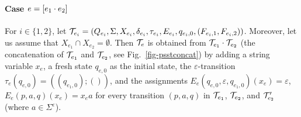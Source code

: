 %	

\paragraph{Case $e = [e_1 \cdot e_2]$} 
For $i \in \{1,2\}$, let  
$\mathcal{T}_{e_i} = (Q_{e_i}, \Sigma, X_{e_i}, \delta_{e_i}, \tau_{e_i}, E_{e_i}, q_{e_i,0}, (F_{e_i,1}, F_{e_i,2}))$. Moreover, let us assume that $X_{e_1}\cap X_{e_2}=\emptyset$.
Then $\mathcal{T}_e$ is obtained from $\mathcal{T}_{e_1} \cdot \mathcal{T}_{e_2}$ (the concatenation of $\mathcal{T}_{e_1}$ and $\mathcal{T}_{e_2}$, see Fig.~\ref{fig-psstconcat}) by adding a string variable $x_e$, a fresh state $q_{e,0}$ as the initial state, the $\varepsilon$-transition $\tau_e(q_{e,0}) = ((q_{e_1,0});())$, and the assignments $E_e(q_{e,0}, \varepsilon, q_{e_1,0})(x_e) = \varepsilon$, $E_e(p, a, q)(x_e) = x_e a$ for every transition $(p, a, q)$ in $\mathcal{T}_{e_1}$, $\mathcal{T}_{e_2}$, and $\mathcal{T}'_{e_2}$ (where $a \in \Sigma^\varepsilon$).


